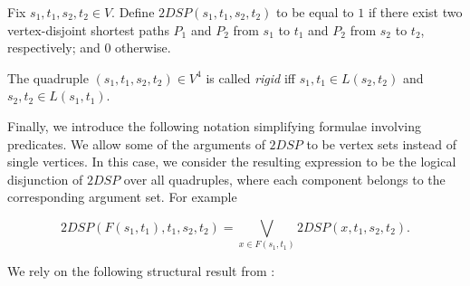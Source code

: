 \begin{definition}
Fix $s_1, t_1, s_2, t_2 \in V$. Define $2DSP(s_1, t_1, s_2, t_2)$ to be equal to $1$ if there exist two vertex-disjoint shortest paths $P_1$ and $P_2$ from $s_1$ to $t_1$ and $P_2$ from $s_2$ to $t_2$, respectively; and $0$ otherwise.
\end{definition}

\begin{definition}
The quadruple $(s_1, t_1, s_2, t_2) \in V^4$ is called \textit{rigid} iff $s_1, t_1 \in L(s_2, t_2)$ and $s_2, t_2 \in L(s_1, t_1)$.
\end{definition}

Finally, we introduce the following notation simplifying formulae involving predicates. We allow some of the arguments of $2DSP$ to be vertex sets instead of single vertices. In this case, we consider the resulting expression to be the logical disjunction of $2DSP$ over all quadruples, where each component belongs to the corresponding argument set. For example

\begin{equation}
2DSP(F(s_1, t_1), t_1, s_2, t_2) = \bigvee\limits_{x \in F(s_1, t_1)} 2DSP(x, t_1, s_2, t_2).
\end{equation}

We rely on the following structural result from \cite{ET}:

